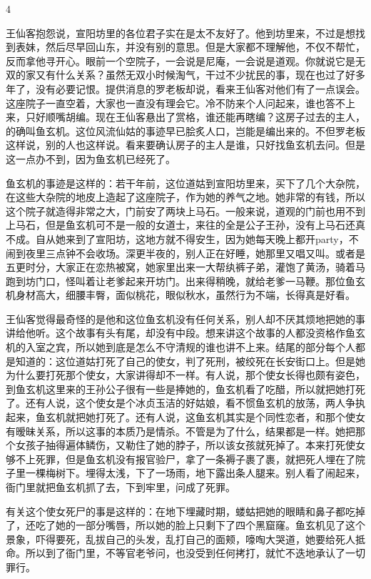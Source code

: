 4 

王仙客抱怨说，宣阳坊里的各位君子实在是太不友好了。他到坊里来，不过是想找到表妹，然后尽早回山东，并没有别的意思。但是大家都不理解他，不仅不帮忙，反而拿他寻开心。眼前一个空院子，一会说是尼庵，一会说是道观。你就说它是无双的家又有什么关系？虽然无双小时候淘气，干过不少扰民的事，现在也过了好多年了，没有必要记恨。提供消息的罗老板却说，看来王仙客对他们有了一点误会。这座院子一直空着，大家也一直没有理会它。冷不防来个人问起来，谁也答不上来，只好顺嘴胡编。现在王仙客悬出了赏格，谁还能再瞎编？这房子过去的主人，的确叫鱼玄机。这位风流仙姑的事迹早已脍炙人口，岂能是编出来的。不但罗老板这样说，别的人也这样说。看来要确认房子的主人是谁，只好找鱼玄机去问。但是这一点办不到，因为鱼玄机已经死了。 

鱼玄机的事迹是这样的：若干年前，这位道姑到宣阳坊里来，买下了几个大杂院，在这些大杂院的地皮上造起了这座院子，作为她的养气之地。她非常的有钱，所以这个院子就造得非常之大，门前安了两块上马石。一般来说，道观的门前也用不到上马石，但是鱼玄机可不是一般的女道士，来往的全是公子王孙，没有上马石还真不成。自从她来到了宣阳坊，这地方就不得安生，因为她每天晚上都开party，不闹到夜里三点钟不会收场。深更半夜的，别人正在好睡，她那里又唱又叫。或者是五更时分，大家正在恋热被窝，她家里出来一大帮纨裤子弟，灌饱了黄汤，骑着马跑到坊门口，怪叫着让老爹起来开坊门。出来得稍晚，就给老爹一马鞭。那位鱼玄机身材高大，细腰丰臀，面似桃花，眼似秋水，虽然行为不端，长得真是好看。 

王仙客觉得最奇怪的是他和这位鱼玄机没有任何关系，别人却不厌其烦地把她的事讲给他听。这个故事有头有尾，却没有中段。想来讲这个故事的人都没资格作鱼玄机的入室之宾，所以她到底是怎么不守清规的谁也讲不上来。结尾的部分每个人都是知道的：这位道姑打死了自己的使女，判了死刑，被绞死在长安街口上。但是她为什么要打死那个使女，大家讲得却不一样。有人说，那个使女长得也颇有姿色，到鱼玄机这里来的王孙公子很有一些是捧她的，鱼玄机看了吃醋，所以就把她打死了。还有人说，这个使女是个冰贞玉洁的好姑娘，看不惯鱼玄机的放荡，两人争执起来，鱼玄机就把她打死了。还有人说，这鱼玄机其实是个同性恋者，和那个使女有暧昧关系，所以这事的本质乃是情杀。不管是为了什么，结果都是一样。她把那个女孩子抽得遍体鳞伤，又勒住了她的脖子，所以该女孩就死掉了。本来打死使女够不上死罪，但是鱼玄机没有报官验尸，拿了一条褥子裹了裹，就把死人埋在了院子里一棵梅树下。埋得太浅，下了一场雨，地下露出条人腿来。别人看了闹起来，衙门里就把鱼玄机抓了去，下到牢里，问成了死罪。 

有关这个使女死尸的事是这样的：在地下埋藏时期，蝼蛄把她的眼睛和鼻子都吃掉了，还吃了她的一部分嘴唇，所以她的脸上只剩下了四个黑窟窿。鱼玄机见了这个景象，吓得要死，乱拔自己的头发，乱打自己的面颊，嚎啕大哭道，她要给死人抵命。所以到了衙门里，不等官老爷问，也没受到任何拷打，就忙不迭地承认了一切罪行。 

